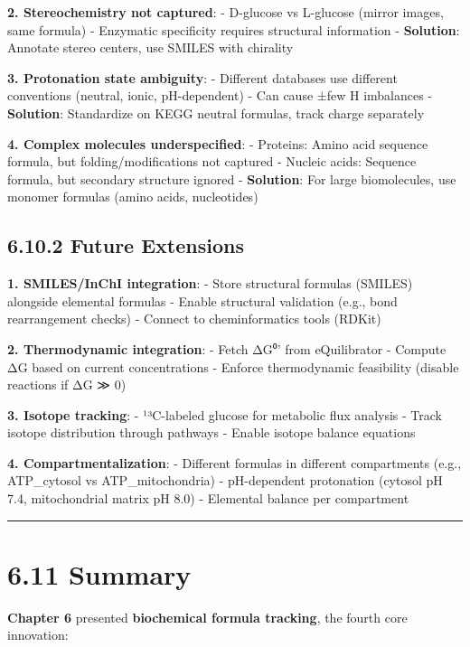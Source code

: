 \textbf{2. Stereochemistry not captured}: - D-glucose vs L-glucose
(mirror images, same formula) - Enzymatic specificity requires
structural information - \textbf{Solution}: Annotate stereo centers, use
SMILES with chirality

\textbf{3. Protonation state ambiguity}: - Different databases use
different conventions (neutral, ionic, pH-dependent) - Can cause ±few H
imbalances - \textbf{Solution}: Standardize on KEGG neutral formulas,
track charge separately

\textbf{4. Complex molecules underspecified}: - Proteins: Amino acid
sequence \textrightarrow formula, but folding/modifications not captured - Nucleic
acids: Sequence \textrightarrow formula, but secondary structure ignored -
\textbf{Solution}: For large biomolecules, use monomer formulas (amino
acids, nucleotides)

\hypertarget{future-extensions}{%
\subsection{6.10.2 Future Extensions}\label{future-extensions}}

\textbf{1. SMILES/InChI integration}: - Store structural formulas
(SMILES) alongside elemental formulas - Enable structural validation
(e.g., bond rearrangement checks) - Connect to cheminformatics tools
(RDKit)

\textbf{2. Thermodynamic integration}: - Fetch ΔG⁰' from eQuilibrator -
Compute ΔG based on current concentrations - Enforce thermodynamic
feasibility (disable reactions if ΔG ≫ 0)

\textbf{3. Isotope tracking}: - ¹³C-labeled glucose for metabolic flux
analysis - Track isotope distribution through pathways - Enable isotope
balance equations

\textbf{4. Compartmentalization}: - Different formulas in different
compartments (e.g., ATP\_cytosol vs ATP\_mitochondria) - pH-dependent
protonation (cytosol pH 7.4, mitochondrial matrix pH 8.0) - Elemental
balance per compartment

\begin{center}\rule{0.5\linewidth}{0.5pt}\end{center}

\hypertarget{summary}{%
\section{6.11 Summary}\label{summary}}

\textbf{Chapter 6} presented \textbf{biochemical formula tracking}, the
fourth core innovation:

